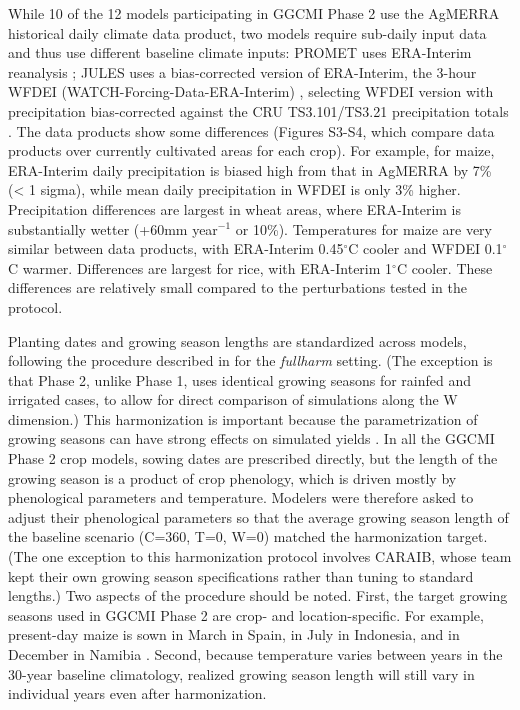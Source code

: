 \documentclass[gmd, manuscript]{copernicus} %
\begin{document}
While 10 of the 12 models participating in GGCMI Phase 2 use the AgMERRA historical daily climate data product, two models require sub-daily input data and thus use different baseline climate inputs:
PROMET uses ERA-Interim reanalysis \citep{dee2011era}; JULES uses a bias-corrected version of ERA-Interim, the 3-hour WFDEI (WATCH-Forcing-Data-ERA-Interim) \citep{weedon2014wfdei}, selecting WFDEI version with precipitation bias-corrected against the CRU TS3.101/TS3.21 precipitation totals \citep{harris_cru_2014}.
The data products show some differences (Figures S3-S4, which compare data products over currently cultivated areas for each crop). 
For example, for maize, ERA-Interim daily precipitation is biased high from that in AgMERRA by 7\% (< 1 sigma), while mean daily precipitation in WFDEI is only 3\% higher. 
Precipitation differences are largest in wheat areas, where ERA-Interim is substantially wetter (+60mm year$^{-1}$ or 10\%). 
Temperatures for maize are very similar between data products, with ERA-Interim 0.45$^\circ$C cooler and WFDEI 0.1$^\circ$C warmer. 
Differences are largest for rice, with ERA-Interim 1$^\circ$C cooler. 
These differences are relatively small compared to the perturbations tested in the protocol.

Planting dates and growing season lengths are standardized across models, following the procedure described in \citet{Elliott2015} for the \textit{fullharm} setting. 
(The exception is that Phase 2, unlike Phase 1, uses identical growing seasons for rainfed and irrigated cases, to allow for direct comparison of simulations along the W dimension.) %
This harmonization is important because the parametrization of growing seasons can have strong effects on simulated yields \citep{muller_global_2017, Jag2018}.
In all the GGCMI Phase 2 crop models, sowing dates are prescribed directly, but the length of the growing season is a product of crop phenology, which is driven mostly by phenological parameters and temperature. 
Modelers were therefore asked to adjust their phenological parameters so that the average growing season length of the baseline scenario (C=360, T=0, W=0) matched the harmonization target. 
(The one exception to this harmonization protocol involves CARAIB, whose team kept their own growing season specifications rather than tuning to standard lengths.)
Two aspects of the procedure should be noted. First, the target growing seasons used in GGCMI Phase 2 are crop- and location-specific.
For example, present-day maize is sown in March in Spain, in July in Indonesia, and in December in Namibia \citep{Portmann2010}.
Second, because temperature varies between years in the 30-year baseline climatology, realized growing season length will still vary in individual years even after harmonization. 
\end{document}
